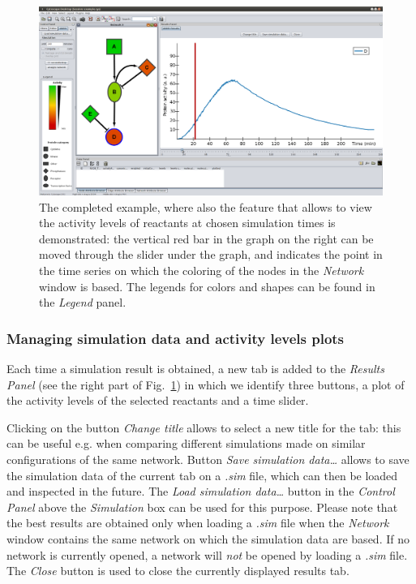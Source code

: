 \begin{figure}[!tpb]
\begin{minipage}{\textwidth}
\begin{center}
  \includegraphics[width=.9\textheight, angle=90]{images/esempio_uso_ANIMO3}
\end{center}
\caption{The completed example, where also the feature that allows to view the activity levels
of reactants at chosen simulation times is demonstrated: the vertical red bar in the graph on the
right can be moved through the slider under the graph, and indicates the point in the time series
on which the coloring of the nodes in the \emph{Network} window is based.
The legends for colors and shapes can be found in the \emph{Legend} panel.}\label{fig:rete-esempio}
\end{minipage}
\end{figure}


\subsubsection{Managing simulation data and activity levels plots}
Each time a simulation result is obtained, a new tab is added to the \emph{Results Panel} (see the right part of Fig.~\ref{fig:rete-esempio})
in which we identify three buttons, a plot of the activity levels of the selected reactants and a time slider.

Clicking on the button \emph{Change title} allows to select a new title for the tab: this can be useful e.g. when comparing different
simulations made on similar configurations of the same network. Button \emph{Save simulation data\dots} allows to save
the simulation data of the current tab on a \emph{.sim} file, which can then be loaded and inspected in the future.
The \emph{Load simulation data\dots} button in the \emph{Control Panel} above the \emph{Simulation} box can be used for this purpose.
Please note that the best results are obtained only when loading a \emph{.sim} file when the \emph{Network} window contains the same network
on which the simulation data are based. If no network is currently opened, a network will \emph{not} be opened by loading a \emph{.sim} file.
The \emph{Close} button is used to close the currently displayed results tab.

